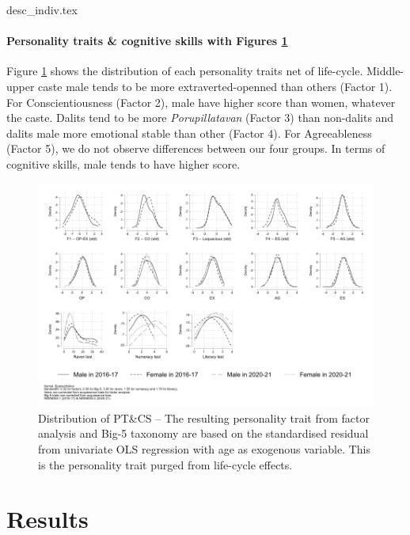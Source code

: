 \documentclass[a4paper, 11pt, onecolumn]{article}
\begin{document}
{desc_indiv.tex}

\paragraph{Personality traits \& cognitive skills with Figures \ref{fig:PTCS}}

Figure \ref{fig:PTCS} shows the distribution of each personality traits net of life-cycle.
Middle-upper caste male tends to be more extraverted-openned than others (Factor 1).
For Conscientiousness (Factor 2), male have higher score than women, whatever the caste.
Dalits tend to be more \textit{Porupillatavan} (Factor 3) than non-dalits
and dalits male more emotional stable than other (Factor 4).
For Agreeableness (Factor 5), we do not observe differences between our four groups.
In terms of cognitive skills, male tends to have higher score.


\begin{figure}[ht]
\raggedright
\includegraphics[width=\textwidth]{INPUT/Kernel_PTCS_raw}
\caption{Distribution of PT\&CS -- The resulting personality trait from factor analysis and Big-5 taxonomy are based on the standardised residual from univariate OLS regression with age as exogenous variable. This is the personality trait purged from life-cycle effects.}
\label{fig:PTCS}
\end{figure}



\newpage
\section{Results}
\label{section:results}
\end{document}
